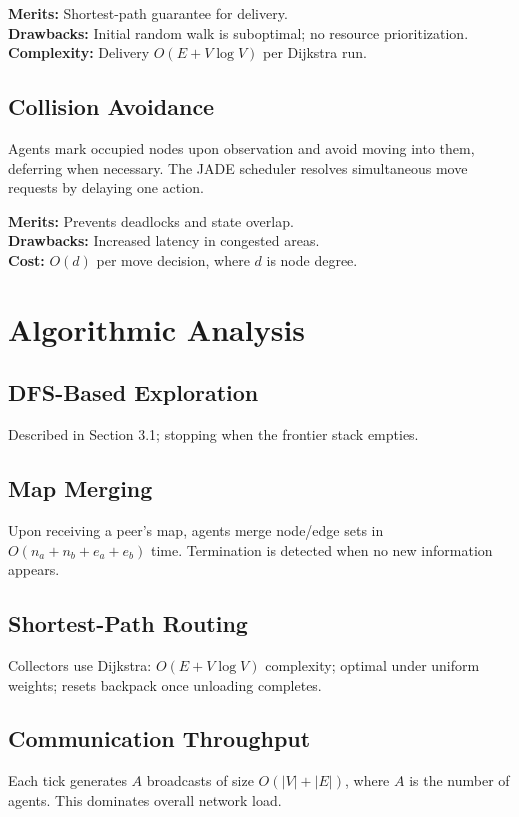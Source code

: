 \documentclass[a4paper,11pt]{article}
\begin{document}
\textbf{Merits:} Shortest-path guarantee for delivery.\\
\textbf{Drawbacks:} Initial random walk is suboptimal; no resource prioritization.\\
\textbf{Complexity:} Delivery $O(E + V\log V)$ per Dijkstra run.

\subsection{Collision Avoidance}
Agents mark occupied nodes upon observation and avoid moving into them, deferring when necessary. The JADE scheduler resolves simultaneous move requests by delaying one action.

\textbf{Merits:} Prevents deadlocks and state overlap.\\
\textbf{Drawbacks:} Increased latency in congested areas.\\
\textbf{Cost:} $O(d)$ per move decision, where $d$ is node degree.

\section{Algorithmic Analysis}
\subsection{DFS-Based Exploration}
Described in Section 3.1; stopping when the frontier stack empties.

\subsection{Map Merging}
Upon receiving a peer’s map, agents merge node/edge sets in $O(n_a + n_b + e_a + e_b)$ time. Termination is detected when no new information appears.

\subsection{Shortest-Path Routing}
Collectors use Dijkstra: $O(E + V\log V)$ complexity; optimal under uniform weights; resets backpack once unloading completes.

\subsection{Communication Throughput}
Each tick generates $A$ broadcasts of size $O(|V|+|E|)$, where $A$ is the number of agents. This dominates overall network load.
\end{document}
